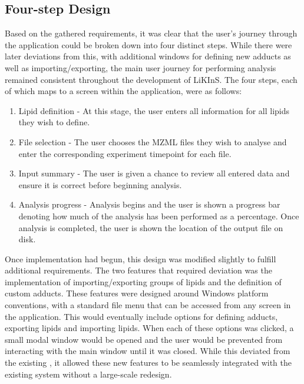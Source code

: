 \documentclass{l4proj}
\begin{document}
\subsection{Four-step Design}
Based on the gathered requirements, it was clear that the user's journey through the application could be broken down into four distinct steps. While there were later deviations from this, with additional windows for defining new adducts as well as importing/exporting, the main user journey for performing analysis remained consistent throughout the development of LiKInS. The four steps, each of which maps to a screen within the application, were as follows:
\begin{enumerate}
    \item Lipid definition - At this stage, the user enters all information for all lipids they wish to define.
    \item File selection - The user chooses the MZML files they wish to analyse and enter the corresponding experiment timepoint for each file.
    \item Input summary - The user is given a chance to review all entered data and ensure it is correct before beginning analysis.
    \item Analysis progress - Analysis begins and the user is shown a progress bar denoting how much of the analysis has been performed as a percentage. Once analysis is completed, the user is shown the location of the output file on disk.
\end{enumerate}
Once implementation had begun, this design was modified slightly to fulfill additional requirements. The two features that required deviation was the implementation of importing/exporting groups of lipids and the definition of custom adducts. These features were designed around Windows platform conventions, with a standard file menu that can be accessed from any screen in the application. This would eventually include options for defining adducts, exporting lipids and importing lipids. When each of these options was clicked, a small modal window would be opened and the user would be prevented from interacting with the main window until it was closed. While this deviated from the existing , it allowed these new features to be seamlessly integrated with the existing system without a large-scale redesign.
\end{document}
